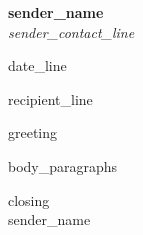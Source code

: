 \documentclass[11pt,a4paper]{article}
\begin{document}
\begin{center}
  {\Large\textbf{{{sender_name}}}}\\[2pt]
  {\small\itshape {{sender_contact_line}}}
\end{center}

\vspace{6pt}

{{date_line}}

\vspace{4pt}

{{recipient_line}}

\vspace{4pt}

{{greeting}}

{{body_paragraphs}}

\vspace{2pt}

{{closing}}\\[24pt]
{{sender_name}}
\end{document}
